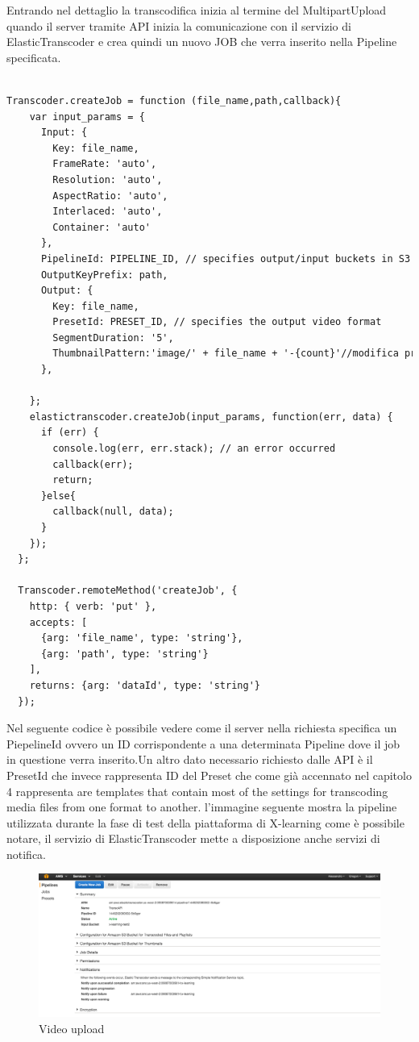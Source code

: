 Entrando nel dettaglio la transcodifica inizia al termine del MultipartUpload quando il server tramite API inizia la comunicazione con il servizio di ElasticTranscoder e crea quindi un nuovo JOB che verra inserito nella Pipeline specificata.
\begin{lstlisting}[language=html]
  
Transcoder.createJob = function (file_name,path,callback){
    var input_params = {
      Input: { 
        Key: file_name, 
        FrameRate: 'auto', 
        Resolution: 'auto', 
        AspectRatio: 'auto', 
        Interlaced: 'auto', 
        Container: 'auto' 
      }, 
      PipelineId: PIPELINE_ID, // specifies output/input buckets in S3 
      OutputKeyPrefix: path,
      Output: { 
        Key: file_name, 
        PresetId: PRESET_ID, // specifies the output video format
        SegmentDuration: '5',
        ThumbnailPattern:'image/' + file_name + '-{count}'//modifica preset per determinare il numero di immagini
      },

    };    
    elastictranscoder.createJob(input_params, function(err, data) {
      if (err) {
        console.log(err, err.stack); // an error occurred
        callback(err);
        return;
      }else{
        callback(null, data);
      }
    });
  };
  
  Transcoder.remoteMethod('createJob', {
    http: { verb: 'put' },
    accepts: [
      {arg: 'file_name', type: 'string'},
      {arg: 'path', type: 'string'}
    ],
    returns: {arg: 'dataId', type: 'string'}
  });
\end{lstlisting}

Nel seguente codice è possibile vedere come il server nella richiesta specifica un PiepelineId ovvero un ID corrispondente a una determinata Pipeline dove il job in questione verra inserito.Un altro dato necessario richiesto dalle API è il PresetId che invece rappresenta ID del Preset che come già accennato nel capitolo 4 rappresenta are templates that contain most of the settings for transcoding media files from one format to another.
l’immagine seguente mostra la pipeline utilizzata durante la fase di test della piattaforma di X-learning come è possibile notare, il servizio di ElasticTranscoder mette a disposizione anche  servizi di notifica.

\begin{figure}[htb]
 \centering
 \includegraphics[width=1.0\linewidth]{images/chapter6/elastic_pipeline.png}\hfill
 \caption[Web Components]{Video upload}
 \label{fig:fourV}
\end{figure}
